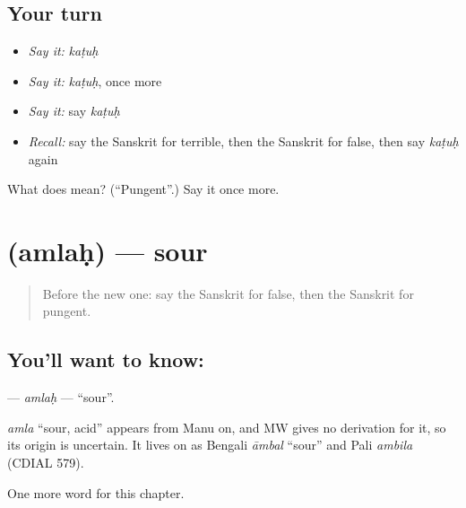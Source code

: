 \subsection*{Your turn}
\begin{itemize}
\raggedright
  \item \emph{Say it:} \emph{kaṭuḥ}
  \item \emph{Say it:} \emph{kaṭuḥ}, once more
  \item \emph{Say it:} say \emph{kaṭuḥ}
  \item \emph{Recall:} say the Sanskrit for terrible, then the Sanskrit for false, then say \emph{kaṭuḥ} again
\end{itemize}

\begin{tcolorbox}[breakable,colback=teal!4,colframe=teal!35!black,title={Before you move on}]
What does  mean? (\textquotedblleft{}Pungent\textquotedblright{}.) Say it once more.
\end{tcolorbox}
\section[\texorpdfstring{\sk{अम्लः} (amlaḥ)}{अम्लः (amlaḥ)}]{ (amlaḥ) — sour}

\label{lesson:SA-C128-amlah}



\begin{quote}
Before the new one: say the Sanskrit for false, then the Sanskrit for pungent.
\end{quote}

\subsection*{You'll want to know: }
\textbf{} — \emph{amlaḥ} — \textquotedblleft{}sour\textquotedblright{}.

\begin{cousinweb}
\emph{amla} \textquotedblleft{}sour, acid\textquotedblright{} appears from Manu on, and MW gives no derivation for it, so its origin is uncertain. It lives on as Bengali \emph{āmbal} \textquotedblleft{}sour\textquotedblright{} and Pali \emph{ambila} (CDIAL 579).
\end{cousinweb}

\begin{grammarlens}[title={What you've built}]
One more word for this chapter.
\end{grammarlens}

